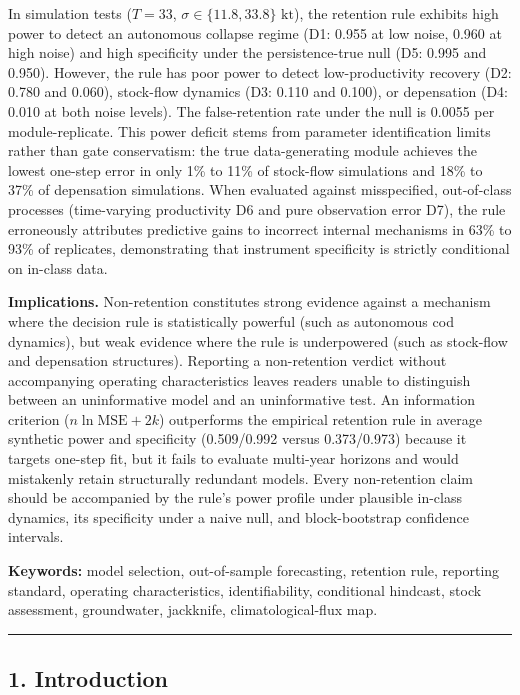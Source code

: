 \documentclass[11pt]{article}
\begin{document}
In simulation tests (\(T = 33\),
\(\sigma \in \{11.8, 33.8\}\text{ kt}\)), the retention rule exhibits
high power to detect an autonomous collapse regime (D1: 0.955 at low
noise, 0.960 at high noise) and high specificity under the
persistence-true null (D5: 0.995 and 0.950). However, the rule has poor
power to detect low-productivity recovery (D2: 0.780 and 0.060),
stock-flow dynamics (D3: 0.110 and 0.100), or depensation (D4: 0.010 at
both noise levels). The false-retention rate under the null is 0.0055
per module-replicate. This power deficit stems from parameter
identification limits rather than gate conservatism: the true
data-generating module achieves the lowest one-step error in only 1\% to
11\% of stock-flow simulations and 18\% to 37\% of depensation
simulations. When evaluated against misspecified, out-of-class processes
(time-varying productivity D6 and pure observation error D7), the rule
erroneously attributes predictive gains to incorrect internal mechanisms
in 63\% to 93\% of replicates, demonstrating that instrument specificity
is strictly conditional on in-class data.

\textbf{Implications.} Non-retention constitutes strong evidence against
a mechanism where the decision rule is statistically powerful (such as
autonomous cod dynamics), but weak evidence where the rule is
underpowered (such as stock-flow and depensation structures). Reporting
a non-retention verdict without accompanying operating characteristics
leaves readers unable to distinguish between an uninformative model and
an uninformative test. An information criterion
(\(n \ln \text{MSE} + 2k\)) outperforms the empirical retention rule in
average synthetic power and specificity (0.509/0.992 versus 0.373/0.973)
because it targets one-step fit, but it fails to evaluate multi-year
horizons and would mistakenly retain structurally redundant models.
Every non-retention claim should be accompanied by the rule's power
profile under plausible in-class dynamics, its specificity under a naive
null, and block-bootstrap confidence intervals.

\textbf{Keywords:} model selection, out-of-sample forecasting, retention
rule, reporting standard, operating characteristics, identifiability,
conditional hindcast, stock assessment, groundwater, jackknife,
climatological-flux map.

\begin{center}\rule{0.5\linewidth}{0.5pt}\end{center}

\subsection{1. Introduction}\label{introduction}
\end{document}

